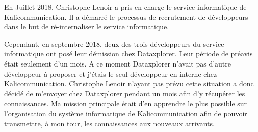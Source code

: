 En Juillet 2018, Christophe Lenoir a pris en charge le service informatique de Kalicommunication. Il a démarré le processus de recrutement de développeurs dans le but de ré-internaliser le service informatique.

Cependant, en septembre 2018, deux des trois développeurs du service informatique ont posé leur démission chez Dataxplorer. Leur période de préavis était seulement d'un mois. A ce moment Dataxplorer n'avait pas d'autre développeur à proposer et j'étais le seul développeur en interne chez Kalicommunication. Christophe Lenoir n'ayant pas prévu cette situation a donc décidé de m'envoyer chez Dataxplorer pendant un mois afin d'y récupérer les connaissances.\newline
Ma mission principale était d'en apprendre le plus possible sur l'organisation du système informatique de Kalicommunication afin de pouvoir transmettre, à mon tour, les connaissances aux nouveaux arrivants.